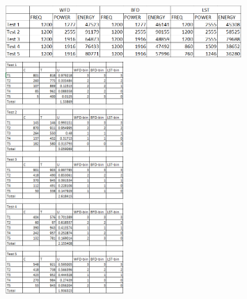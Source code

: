 \documentclass[letterpaper,12pt]{article}
\begin{document}
	\begin{figure}
		\centering
		\includegraphics[width=0.8\textwidth]{./img/T1}\\
		\includegraphics[width=0.4\textwidth]{./img/T2}\\
	\end{figure}
	\newpage
\end{document}
